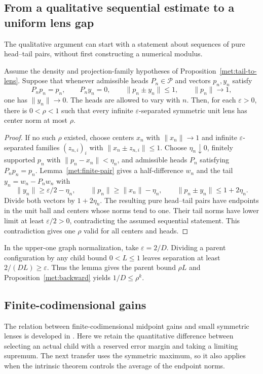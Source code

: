 \subsection{From a qualitative sequential estimate to a uniform lens gap}
\label{met:bridge:sequential-section}
The qualitative argument can start with a statement about sequences of
pure head--tail pairs, without first constructing a numerical modulus.


\begin{lemma}\label{met:bridge:sequential-lens}
Assume the density and projection-family hypotheses of
Proposition~\ref{met:tail-to-lens}. Suppose that whenever admissible heads $P_n\in\mathcal P$
and vectors $p_n,y_n$ satisfy
\[
 P_np_n=p_n,\qquad P_ny_n=0,\qquad
 \|p_n\pm y_n\|\le1,\qquad \|p_n\|\longrightarrow1,
\]
one has $\|y_n\|\longrightarrow0$. The heads are allowed to vary
with $n$. Then, for each $\varepsilon>0$, there is $0<\rho<1$
such that every infinite $\varepsilon$-separated symmetric unit lens
has center norm at most $\rho$.
\end{lemma}
\begin{proof}
If no such $\rho$ existed, choose centers $x_n$ with
$\|x_n\|\to1$ and infinite $\varepsilon$-separated families
$(z_{n,i})_i$ with $\|x_n\pm z_{n,i}\|\le1$.
Choose $\eta_n\downarrow0$, finitely supported $p_n$ with
$\|p_n-x_n\|<\eta_n$, and admissible heads $P_n$ satisfying
$P_np_n=p_n$. Lemma~\ref{met:finite-pair} gives a half-difference
$w_n$ and the tail $y_n=w_n-P_nw_n$ with
\[
 \|y_n\|\ge\varepsilon/2-\eta_n,\qquad
 \|p_n\|\ge\|x_n\|-\eta_n,\qquad
 \|p_n\pm y_n\|\le1+2\eta_n.
\]
Divide both vectors by $1+2\eta_n$. The resulting pure head--tail
pairs have endpoints in the unit ball and centers whose norms tend
to one. Their tail norms have lower limit at least
$\varepsilon/2>0$, contradicting the assumed sequential statement.
This contradiction gives one $\rho$ valid for all centers and heads.
\end{proof}

In the upper-one graph normalization, take $\varepsilon=2/D$.
Dividing a parent configuration by any child bound $0<L\le1$
leaves separation at least $2/(DL)\ge\varepsilon$. Thus the lemma
gives the parent bound $\rho L$ and
Proposition~\ref{met:backward} yields $1/D\le\rho^k$.
\subsection{Finite-codimensional gains}\label{met:quotient-section}
The relation between finite-codimensional midpoint gains and small
symmetric lenses is developed in \cite[Theorem~2.1]{DKRRZ2016}.
Here we retain the quantitative difference between selecting an actual
child with a reserved error margin and taking a limiting supremum.
The next transfer uses the symmetric maximum, so it also applies when the
intrinsic theorem controls the average of the endpoint norms.

